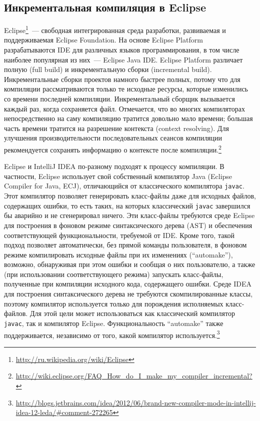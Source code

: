 \subsection{Инкрементальная компиляция в Eclipse}
Eclipse\footnote{\url{http://ru.wikipedia.org/wiki/Eclipse}}~--- свободная интегрированная среда разработки, развиваемая и поддерживаемая Eclipse Foundation. На основе Eclipse Platform разрабатываются IDE для различных языков программирования, в том числе наиболее популярная из них~--- Eclipse Java IDE.
Eclipse Platform различает полную (full build) и инкрементальную сборки (incremental build). Инкрементальные сборки проектов намного быстрее полных, потому что для компиляции рассматриваются только те исходные ресурсы, которые изменились со времени последней компиляции.
Инкрементальный сборщик вызывается каждый раз, когда сохраняется файл. Отмечается, что во многих компиляторах непосредственно на саму компиляцию тратится довольно мало времени; большая часть времени тратится на разрешение контекста (context resolving). Для улучшения производительности последовательных сеансов компиляции рекомендуется сохранять информацию о контексте после компиляции.\footnote{\url{http://wiki.eclipse.org/FAQ_How_do_I_make_my_compiler_incremental?}}

Eclipse и IntelliJ IDEA по-разному подходят к процессу компиляции. В частности, Eclipse использует свой собственный компилятор Java (Eclipse Compiler for Java, ECJ), отличающийся от классического компилятора \texttt{javac}. Этот компилятор позволяет генерировать класс-файлы даже для исходных файлов, содержащих ошибки, то есть таких, на которых классический \texttt{javac} завершился бы аварийно и не сгенерировал ничего. Эти класс-файлы требуются среде Eclipse для построения в фоновом режиме синтаксического дерева (AST) и обеспечения соответствующей функциональности, требуемой от IDE. Кроме того, такой подход позволяет автоматически, без прямой команды пользователя, в фоновом режиме компилировать исходные файлы при их изменениях (``automake''), возможно, обнаруживая при этом ошибки и сообщая о них пользователю, а также (при использовании соответствующего режима) запускать класс-файлы, полученные при компиляции исходного кода, содержащего ошибки.
Среде IDEA для построения синтаксического дерева не требуются скомпилированные классы, поэтому компилятор используется только для порождения исполняемых класс-файлов. Для этой цели может использоваться как классический компилятор \texttt{javac}, так и компилятор Eclipse. Функциональность ``automake'' также поддерживается, независимо от того, какой компилятор используется.\footnote{\url{http://blogs.jetbrains.com/idea/2012/06/brand-new-compiler-mode-in-intellij-idea-12-leda/\#comment-272265}}

